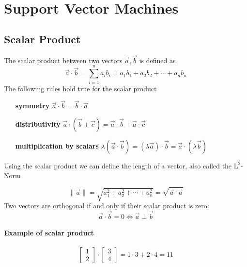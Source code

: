 \documentclass[a4paper, 11pt]{article}
\begin{document}
\section{Support Vector Machines}

\subsection{Scalar Product}
The scalar product between two vectors $\vec{a}, \vec{b}$ is defined as
\begin{equation}
\vec{a}\cdot\vec{b}=\sum_{i=1}^{n}a_i b_i = a_1 b_1 + a_2 b_2 + \cdots + a_n b_n
\end{equation}
\noindent
The following rules hold true for the scalar product

\begin{itemize}[leftmargin=*, labelindent=5cm, labelsep=0.5cm]
	\item[\textbf{symmetry}] $\vec{a}\cdot\vec{b} = \vec{b}\cdot\vec{a}$
	\item[\textbf{distributivity}] $\vec{a}\cdot(\vec{b}+\vec{c}) = \vec{a}\cdot\vec{b} + \vec{a}\cdot\vec{c} $
	\item[\textbf{multiplication by scalars}] $\lambda(\vec{a}\cdot\vec{b}) = (\lambda\vec{a})\cdot\vec{b} = \vec{a}\cdot(\lambda\vec{b})$
\end{itemize}
\noindent
Using the scalar product we can define the length of a vector, also called the $\text{L}^2$-Norm

\begin{equation}
\| \vec{a} \| = \sqrt{a_1^2 + a_2^2 + \cdots + a_n^2} = \sqrt{\vec{a}\cdot\vec{a}}
\end{equation}
\noindent
Two vectors are orthogonal if and only if their scalar product is zero:
\begin{equation}
\vec{a}\cdot\vec{b} = 0 \Leftrightarrow \vec{a} \perp \vec{b}
\end{equation}

\paragraph{Example of scalar product}
\begin{equation*}
\begin{bmatrix}1\\2\end{bmatrix}\cdot\begin{bmatrix}3\\4\end{bmatrix} = 1\cdot 3 + 2\cdot 4 = 11
\end{equation*}
\end{document}
